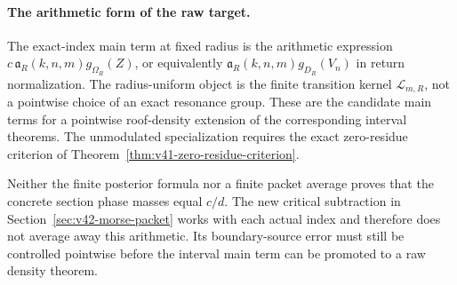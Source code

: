 \paragraph{The arithmetic form of the raw target.}
The exact-index main term at fixed radius is the arithmetic expression
$c\,\mathfrak a_R(k,n,m)g_{\Omega_R}(Z)$, or equivalently
$\mathfrak a_R(k,n,m)g_{D_R}(V_n)$ in return normalization. The
radius-uniform object is the finite transition kernel
$\mathcal L_{m,R}$, not a pointwise choice of an exact resonance group.
These are the candidate main terms for a pointwise roof-density
extension of the corresponding interval theorems. The unmodulated
specialization requires the exact zero-residue criterion of
Theorem~\ref{thm:v41-zero-residue-criterion}.

Neither the finite posterior formula nor a finite packet average
proves that the concrete section phase masses equal $c/d$. The new
critical subtraction in Section~\ref{sec:v42-morse-packet} works with
each actual index and therefore does not average away this arithmetic.
Its boundary-source error must still be controlled pointwise before
the interval main term can be promoted to a raw density theorem.
